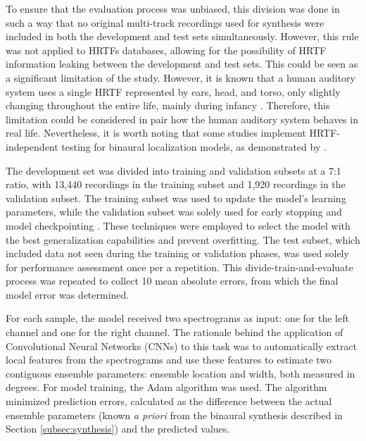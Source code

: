 \documentclass[11pt]{article}
\begin{document}
To ensure that the evaluation process was unbiased, this division was done in such a way that no original multi-track recordings used for synthesis were included in both the development and test sets simultaneously. However, this rule was not applied to HRTFs databases, allowing for the possibility of HRTF information leaking between the development and test sets. This could be seen as a significant limitation of the study. However, it is known that a human auditory system uses a single HRTF represented by ears, head, and torso, only slightly changing throughout the entire life, mainly during infancy \parencite{clifton_growth_1988, king_how_2001}. Therefore, this limitation could be considered in pair how the human auditory system behaves in real life. Nevertheless, it is worth noting that some studies implement HRTF-independent testing for binaural localization models, as demonstrated by \textcite{zielinski_spatial_2022, zielinski_automatic_2022,antoniuk_blind_2023}.

The development set was divided into training and validation subsets at a 7:1 ratio, with 13,440 recordings in the training subset and 1,920 recordings in the validation subset. The training subset was used to update the model's learning parameters, while the validation subset was solely used for early stopping \parencite{pocock_practical_1989, morgan_generalization_1989} and model checkpointing \parencite{eisenman_check-n-run_2020}. These techniques were employed to select the model with the best generalization capabilities and prevent overfitting. The test subset, which included data not seen during the training or validation phases, was used solely for performance assessment once per a repetition. This divide-train-and-evaluate process was repeated to collect 10 mean absolute errors, from which the final model error was determined.

For each sample, the model received two spectrograms as input: one for the left channel and one for the right channel. The rationale behind the application of Convolutional Neural Networks (CNNs) to this task was to automatically extract local features from the spectrograms and use these features to estimate two contiguous ensemble parameters: ensemble location and width, both measured in degrees. For model training, the Adam algorithm \parencite{kingma_adam_2014} was used. The algorithm minimized prediction errors, calculated as the difference between the actual ensemble parameters (known \textit{a priori} from the binaural synthesis described in Section \ref{subsec:synthesis}) and the predicted values.
\end{document}
